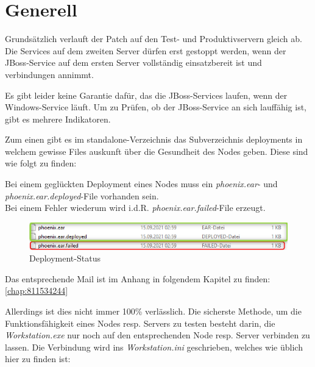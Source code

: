 
\chapter{Generell}
\begin{flushleft}
    Grundsätzlich verlauft der Patch auf den Test- und Produktivservern gleich ab.
    Die Services auf dem zweiten Server dürfen erst gestoppt werden, wenn der \Gls{JBoss}-Service auf dem ersten Server vollständig einsatzbereit ist und
    verbindungen annimmt.
\end{flushleft}
\begin{flushleft}
    Es gibt leider keine Garantie dafür, das die \Gls{JBoss}-Services laufen, wenn der Windows-Service läuft.
    Um zu Prüfen, ob der \Gls{JBoss}-Service an sich lauffähig ist, gibt es mehrere Indikatoren.
\end{flushleft}
\begin{flushleft}
    Zum einen gibt es im standalone-Verzeichnis das Subverzeichnis deployments in welchem gewisse Files auskunft über die Gesundheit des Nodes geben.
    Diese sind wie folgt zu finden:
\end{flushleft}
\begin{flushleft}
    Bei einem geglückten Deployment eines Nodes muss ein \textit{phoenix.ear}- und \textit{phoenix.ear.deployed}-File vorhanden sein.\\Bei einem Fehler wiederum wird i.d.R. \textit{phoenix.ear.failed}-File erzeugt.
    \begin{figure}[H]
        \centering
        \includegraphics[width=1\linewidth]{source/general/deployments}
        \caption{Deployment-Status}
        \label{fig:deployment-status}
    \end{figure}
    Das entsprechende Mail ist im Anhang in folgendem Kapitel zu finden: \autoref{chap:811534244}
\end{flushleft}
\begin{flushleft}
    Allerdings ist dies nicht immer 100\% verlässlich.
    Die sicherste Methode, um die Funktionsfähigkeit eines Nodes resp.
    Servers zu testen besteht darin, die \textit{Workstation.exe} nur noch auf den entsprechenden Node resp.
    Server verbinden zu lassen.
    Die Verbindung wird ins \textit{Workstation.ini} geschrieben, welches wie üblich hier zu finden ist:
\end{flushleft}
